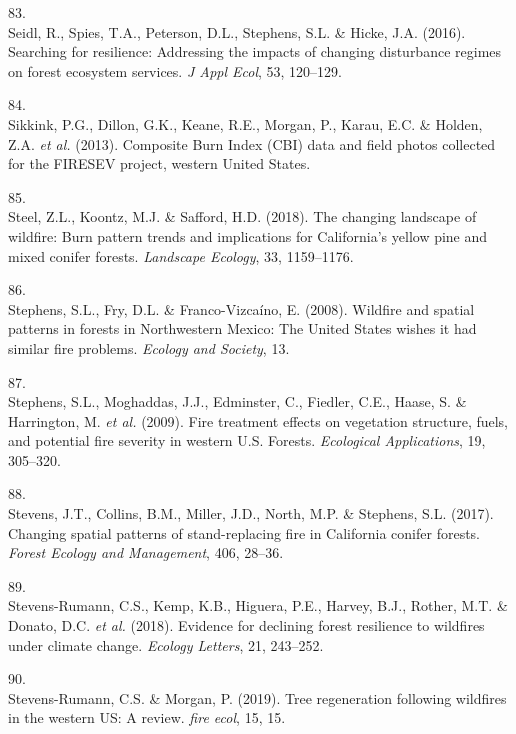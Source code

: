 \documentclass[]{article}
\begin{document}
\leavevmode\hypertarget{ref-seidl2016b}{}%
83.\\
Seidl, R., Spies, T.A., Peterson, D.L., Stephens, S.L. \& Hicke, J.A.
(2016). Searching for resilience: Addressing the impacts of changing
disturbance regimes on forest ecosystem services. \emph{J Appl Ecol},
53, 120--129.

\leavevmode\hypertarget{ref-sikkink2013}{}%
84.\\
Sikkink, P.G., Dillon, G.K., Keane, R.E., Morgan, P., Karau, E.C. \&
Holden, Z.A. \emph{et al.} (2013). Composite Burn Index (CBI) data and
field photos collected for the FIRESEV project, western United States.

\leavevmode\hypertarget{ref-steel2018}{}%
85.\\
Steel, Z.L., Koontz, M.J. \& Safford, H.D. (2018). The changing
landscape of wildfire: Burn pattern trends and implications for
California's yellow pine and mixed conifer forests. \emph{Landscape
Ecology}, 33, 1159--1176.

\leavevmode\hypertarget{ref-stephens2008}{}%
86.\\
Stephens, S.L., Fry, D.L. \& Franco-Vizcaíno, E. (2008). Wildfire and
spatial patterns in forests in Northwestern Mexico: The United States
wishes it had similar fire problems. \emph{Ecology and Society}, 13.

\leavevmode\hypertarget{ref-stephens2009}{}%
87.\\
Stephens, S.L., Moghaddas, J.J., Edminster, C., Fiedler, C.E., Haase, S.
\& Harrington, M. \emph{et al.} (2009). Fire treatment effects on
vegetation structure, fuels, and potential fire severity in western U.S.
Forests. \emph{Ecological Applications}, 19, 305--320.

\leavevmode\hypertarget{ref-stevens2017}{}%
88.\\
Stevens, J.T., Collins, B.M., Miller, J.D., North, M.P. \& Stephens,
S.L. (2017). Changing spatial patterns of stand-replacing fire in
California conifer forests. \emph{Forest Ecology and Management}, 406,
28--36.

\leavevmode\hypertarget{ref-stevens-rumann2018}{}%
89.\\
Stevens-Rumann, C.S., Kemp, K.B., Higuera, P.E., Harvey, B.J., Rother,
M.T. \& Donato, D.C. \emph{et al.} (2018). Evidence for declining forest
resilience to wildfires under climate change. \emph{Ecology Letters},
21, 243--252.

\leavevmode\hypertarget{ref-stevens-rumann2019}{}%
90.\\
Stevens-Rumann, C.S. \& Morgan, P. (2019). Tree regeneration following
wildfires in the western US: A review. \emph{fire ecol}, 15, 15.
\end{document}
